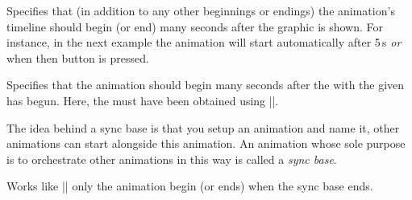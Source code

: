 \begin{command}{\pgfsysanimkeyoffset{}}
\end{command}
\begin{command}{\pgfsys@animation@offset{}}
    Specifies that (in addition to any other beginnings or endings) the
    animation's timeline should begin (or end)  many seconds
    after the graphic is shown. For instance, in the next example the animation
    will start automatically after 5\,s \emph{or} when then button is pressed.
\begin{codeexample}[
    width=6cm,
    preamble={\usetikzlibrary{animations}},
    animation list={1,2,3,4,5,6,7,8},
render instead={
\animationexample{node}{}{
  \pgfsysanimkeytime{0}{1}{1}{0}{0}
  \pgfsysanimvaltranslate{0cm}{0cm}
  \pgfsysanimkeytime{2}{1}{1}{0}{0}
  \pgfsysanimvaltranslate{0cm}{-1cm}
  \pgfsysanimkeyoffset{5}{begin}
  \pgfsysanimkeysnapshotstart{5}
  \pgfsysanimate{translate} }
    }]
\end{codeexample}
\end{command}

\begin{command}{\pgfsysanimkeysyncbegin{}}
\end{command}
\begin{command}{\pgfsys@animation@syncbegin{}}
    Specifies that the animation should begin  many seconds
    after the  with the given  has begun. Here,
    the  must have been obtained using |\pgfsys@new@id|.

    The idea behind a sync base is that you setup an animation and name it,
    other animations can start alongside this animation. An animation whose
    sole purpose is to orchestrate other animations in this way is called a
    \emph{sync base}.
\end{command}

\begin{command}{\pgfsysanimkeysyncend{}}
\end{command}
\begin{command}{\pgfsys@animation@syncend{}}
    Works like |\pgfsysanimkeysyncbegin| only the animation begin (or ends)
    when the sync base ends.
\end{command}

